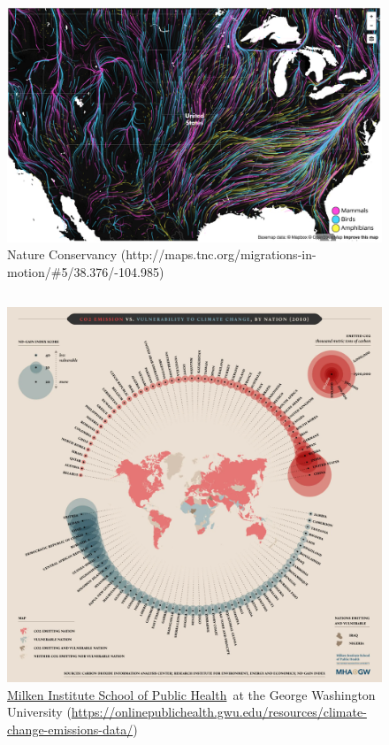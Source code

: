 \documentclass[
  letterpaper,
  DIV=11,
  numbers=noendperiod]{scrartcl}
\begin{document}
\begin{figure}

{\centering \includegraphics{InClassStatic/migrations.png}

}

\caption{Nature Conservancy
(http://maps.tnc.org/migrations-in-motion/\#5/38.376/-104.985)}

\end{figure}

\hypertarget{section-3}{%
\subsection{}\label{section-3}}

\begin{figure}

{\centering \includegraphics{InClassStatic/Climate_Change_carbon_v_vulnerability.png}

}

\caption{\href{http://publichealth.gwu.edu/}{Milken Institute School of
Public Health}~at the George Washington University
(\url{https://onlinepublichealth.gwu.edu/resources/climate-change-emissions-data/})}

\end{figure}
\end{document}
